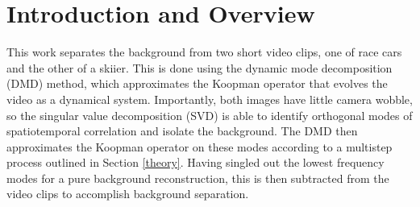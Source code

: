 \documentclass{article}
\begin{document}
\section{Introduction and Overview}
This work separates the background from two short video clips, one of race cars and the other of a skiier. This is done using the dynamic mode decomposition (DMD) method, which approximates the Koopman operator that evolves the video as a dynamical system. Importantly, both images have little camera wobble, so the singular value decomposition (SVD) is able to identify orthogonal modes of spatiotemporal correlation and isolate the background. The DMD then approximates the Koopman operator on these modes according to a multistep process outlined in Section \ref{theory}. Having singled out the lowest frequency modes for a pure background reconstruction, this is then subtracted from the video clips to accomplish background separation.


\end{document}
